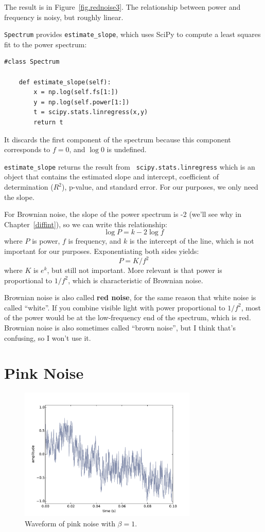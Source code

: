 \documentclass[12pt]{book}
\begin{document}
The result is in Figure~\ref{fig.rednoise3}.  The relationship between
power and frequency is noisy, but roughly linear.

{\tt Spectrum} provides \verb"estimate_slope", which uses SciPy to compute
a least squares fit to the power spectrum:

\begin{verbatim}
#class Spectrum

    def estimate_slope(self):
        x = np.log(self.fs[1:])
        y = np.log(self.power[1:])
        t = scipy.stats.linregress(x,y)
        return t
\end{verbatim}

It discards the first component of the spectrum because
this component corresponds to $f=0$, and $\log 0$ is undefined.

\verb"estimate_slope" returns the result from {\tt
  scipy.stats.linregress} which is an object that contains the
estimated slope and intercept, coefficient of determination ($R^2$),
p-value, and standard error.  For our purposes, we only need the
slope.

For Brownian noise, the slope of the power spectrum is -2 (we'll see
why in Chapter~\ref{diffint}), so we can write this relationship:
%
\[ \log P = k -2 \log f \]
%
where $P$ is power, $f$ is frequency, and $k$ is the intercept
of the line, which is not important for our purposes.
Exponentiating both sides yields:
%
\[ P = K / f^{2} \]
%
where $K$ is $e^k$, but still not important.  More relevant is
that power is proportional to $1/f^2$, which is characteristic
of Brownian noise.

Brownian noise is also called {\bf red noise}, for the same reason that
white noise is called ``white''.  If you combine visible light with
power proportional to $1/f^2$, most of the power
would be at the low-frequency end of the spectrum, which is red.
Brownian noise is also sometimes called ``brown noise'', but I think
that's confusing, so I won't use it.



\section{Pink Noise}
\label{pink}

\begin{figure}
\centerline{\includegraphics[height=2.5in]{figs/pinknoise0.pdf}}
\caption{Waveform of pink noise with $\beta=1$.}
\label{fig.pinknoise0}
\end{figure}
\end{document}

